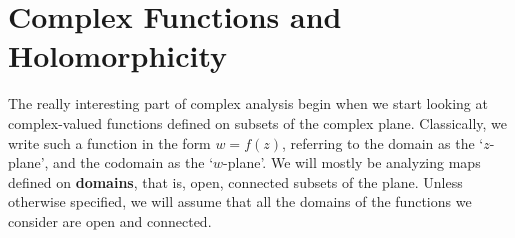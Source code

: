 \section{Complex Functions and Holomorphicity}

The really interesting part of complex analysis begin when we start looking at complex-valued functions defined on subsets of the complex plane. Classically, we write such a function in the form $w = f(z)$, referring to the domain as the `$z$-plane', and the codomain as the `$w$-plane'. We will mostly be analyzing maps defined on {\bf domains}, that is, open, connected subsets of the plane. Unless otherwise specified, we will assume that all the domains of the functions we consider are open and connected.
%
%
%

